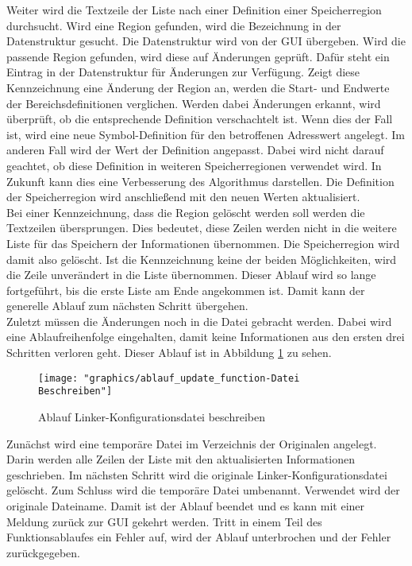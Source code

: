 Weiter wird die Textzeile der Liste nach einer Definition einer Speicherregion durchsucht.
Wird eine Region gefunden, wird die Bezeichnung in der Datenstruktur gesucht.
Die Datenstruktur wird von der \ac{GUI} übergeben.
Wird die passende Region gefunden, wird diese auf Änderungen geprüft.
Dafür steht ein Eintrag in der Datenstruktur für Änderungen zur Verfügung.
Zeigt diese Kennzeichnung eine Änderung der Region an, werden die Start- und Endwerte der Bereichsdefinitionen verglichen.
Werden dabei Änderungen erkannt, wird überprüft, ob die entsprechende Definition verschachtelt ist.
Wenn dies der Fall ist, wird eine neue Symbol-Definition für den betroffenen Adresswert angelegt.
Im anderen Fall wird der Wert der Definition angepasst.
Dabei wird nicht darauf geachtet, ob diese Definition in weiteren Speicherregionen verwendet wird.
In Zukunft kann dies eine Verbesserung des Algorithmus darstellen.
Die Definition der Speicherregion wird anschließend mit den neuen Werten aktualisiert. \\

Bei einer Kennzeichnung, dass die Region gelöscht werden soll werden die Textzeilen übersprungen.
Dies bedeutet, diese Zeilen werden nicht in die weitere Liste für das Speichern der Informationen übernommen.
Die Speicherregion wird damit also gelöscht.
Ist die Kennzeichnung keine der beiden Möglichkeiten, wird die Zeile unverändert in die Liste übernommen.
Dieser Ablauf wird so lange fortgeführt, bis die erste Liste am Ende angekommen ist.
Damit kann der generelle Ablauf zum nächsten Schritt übergehen. \\

Zuletzt müssen die Änderungen noch in die Datei gebracht werden.
Dabei wird eine Ablaufreihenfolge eingehalten, damit keine Informationen aus den ersten drei Schritten verloren geht.
Dieser Ablauf ist in Abbildung \ref{fig:ablaufupdatefunction-datei-beschreiben} zu sehen. \\

\begin{figure}[H]
	\centering
	\texttt{[image: "graphics/ablauf\_update\_function-Datei Beschreiben"]}
	\caption{Ablauf Linker-Konfigurationsdatei beschreiben}
	\label{fig:ablaufupdatefunction-datei-beschreiben}
\end{figure}

Zunächst wird eine temporäre Datei im Verzeichnis der Originalen angelegt.
Darin werden alle Zeilen der Liste mit den aktualisierten Informationen geschrieben.
Im nächsten Schritt wird die originale Linker-Konfigurationsdatei gelöscht.
Zum Schluss wird die temporäre Datei umbenannt.
Verwendet wird der originale Dateiname.
Damit ist der Ablauf beendet und es kann mit einer Meldung zurück zur \ac{GUI} gekehrt werden.
Tritt in einem Teil des Funktionsablaufes ein Fehler auf, wird der Ablauf unterbrochen und der Fehler zurückgegeben.

